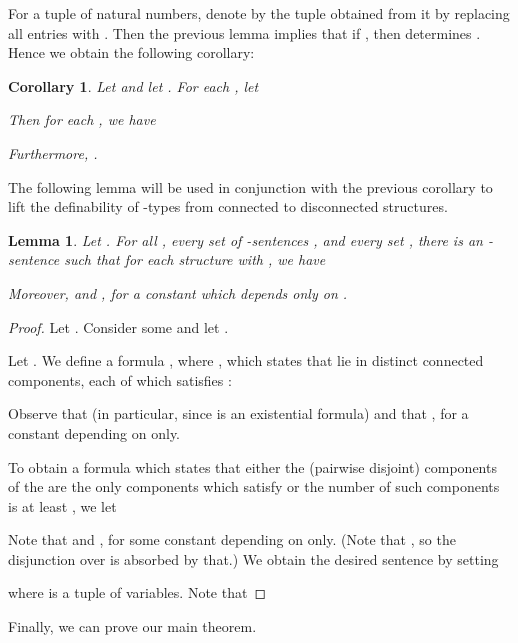 \documentclass[11pt]{article}
\newtheorem{lemma}[theorem]{Lemma}
\newtheorem{corollary}[theorem]{Corollary}
\begin{document}
For a tuple  of natural numbers, denote by  the
tuple obtained from it by replacing all entries  with .  Then
the previous lemma implies that if , then
 determines
. Hence we obtain the following corollary:

\begin{corollary}
  \label{cor:tau-set}
  Let  and let . For each , let
  
  Then for each , we have
  
  Furthermore, .
\end{corollary}

The following lemma will be used in conjunction with the previous corollary to
lift the definability of -types from connected to disconnected structures.
\begin{lemma}
  \label{lem:counting-formulae}
  Let . For all , every
  set of -sen\-tences , and every set
  , there is an -sentence
   such that for each structure  with , we have
  
  Moreover, 
     and
  ,
for a constant  which depends only on .
\end{lemma}
\begin{proof}
  Let .
  Consider some  and let .

  Let . We define a formula , where
  , which states that 
  lie in distinct connected components, each of which satisfies
  :
  
  Observe that  (in particular,
  since  is an existential formula) and that
  ,
  for a constant  depending on  only.

  To obtain a formula which states that either the (pairwise disjoint)
  components of the  are the only components which
  satisfy  or the number of such components is at least ,
  we let
  
  Note that  and
  , for some constant 
  depending on  only. (Note that , so the
  disjunction over  is absorbed by that.) We obtain the desired
  sentence  by setting 
  
  where  is a tuple of  variables. Note that
  \end{proof}

Finally, we can prove our main theorem.
\end{document}
